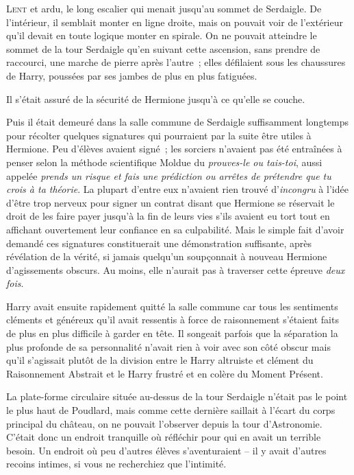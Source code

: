 
\lettrine{L}{ent} et ardu, le long escalier qui menait jusqu'au sommet de Serdaigle. De l'intérieur, il semblait monter en ligne droite, mais on pouvait voir de l'extérieur qu'il devait en toute logique monter en spirale. On ne pouvait atteindre le sommet de la tour Serdaigle qu'en suivant cette ascension, sans prendre de raccourci, une marche de pierre après l'autre~; elles défilaient sous les chaussures de Harry, poussées par ses jambes de plus en plus fatiguées.

Il s'était assuré de la sécurité de Hermione jusqu'à ce qu'elle se couche.

Puis il était demeuré dans la salle commune de Serdaigle suffisamment longtemps pour récolter quelques signatures qui pourraient par la suite être utiles à Hermione. Peu d'élèves avaient signé~; les sorciers n'avaient pas été entraînées à penser selon la méthode scientifique Moldue du \emph{prouves-le ou tais-toi}, aussi appelée \emph{prends un risque et fais une prédiction ou arrêtes de prétendre que tu crois à ta théorie}. La plupart d'entre eux n'avaient rien trouvé d'\emph{incongru} à l'idée d'être trop nerveux pour signer un contrat disant que Hermione se réservait le droit de les faire payer jusqu'à la fin de leurs vies s'ils avaient eu tort tout en affichant ouvertement leur confiance en sa culpabilité. Mais le simple fait d'avoir demandé ces signatures constituerait une démonstration suffisante, après révélation de la vérité, si jamais quelqu'un soupçonnait à nouveau Hermione d'agissements obscurs. Au moins, elle n'aurait pas à traverser cette épreuve \emph{deux fois}.

Harry avait ensuite rapidement quitté la salle commune car tous les sentiments cléments et généreux qu'il avait ressentis à force de raisonnement s'étaient faits de plus en plus difficile à garder en tête. Il songeait parfois que la séparation la plus profonde de sa personnalité n'avait rien à voir avec son côté obscur mais qu'il s'agissait plutôt de la division entre le Harry altruiste et clément du Raisonnement Abstrait et le Harry frustré et en colère du Moment Présent.

La plate-forme circulaire située au-dessus de la tour Serdaigle n'était pas le point le plus haut de Poudlard, mais comme cette dernière saillait à l'écart du corps principal du château, on ne pouvait l'observer depuis la tour d'Astronomie. C'était donc un endroit tranquille où réfléchir pour qui en avait un terrible besoin. Un endroit où peu d'autres élèves s'aventuraient -- il y avait d'autres recoins intimes, si vous ne recherchiez que l'intimité.

